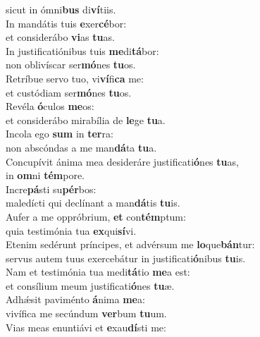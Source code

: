\evenverse sicut in ómni\textbf{bus} di\textbf{ví}tiis.\\
\oddverse In mandátis tuis \textbf{e}xer\textbf{cé}bor:~\*\\
\oddverse et considerábo \textbf{vi}as \textbf{tu}as.\\
\evenverse In justificatiónibus tuis \textbf{me}di\textbf{tá}bor:~\*\\
\evenverse non oblivíscar ser\textbf{mó}nes \textbf{tu}os.\\
\oddverse Retríbue servo tuo, vi\textbf{ví}fi\textbf{ca} me:~\*\\
\oddverse et custódiam ser\textbf{mó}nes \textbf{tu}os.\\
\evenverse Revéla \textbf{ó}culos \textbf{me}os:~\*\\
\evenverse et considerábo mirabília de \textbf{le}ge \textbf{tu}a.\\
\oddverse Incola ego \textbf{sum} in \textbf{ter}ra:~\*\\
\oddverse non abscóndas a me man\textbf{dá}ta \textbf{tu}a.\\
\evenverse Concupívit ánima mea desideráre justificati\textbf{ó}nes \textbf{tu}as,~\*\\
\evenverse in \textbf{om}ni \textbf{tém}pore.\\
\oddverse Incre\textbf{pá}sti su\textbf{pér}bos:~\*\\
\oddverse maledícti qui declínant a man\textbf{dá}tis \textbf{tu}is.\\
\evenverse Aufer a me oppróbrium, \textbf{et} con\textbf{tém}ptum:~\*\\
\evenverse quia testimónia tua \textbf{ex}qui\textbf{sí}vi.\\
\oddverse Etenim sedérunt príncipes, et advérsum me \textbf{lo}que\textbf{bán}tur:~\*\\
\oddverse servus autem tuus exercebátur in justificati\textbf{ó}nibus \textbf{tu}is.\\
\evenverse Nam et testimónia tua medi\textbf{tá}tio \textbf{me}a est:~\*\\
\evenverse et consílium meum justificati\textbf{ó}nes \textbf{tu}æ.\\
\oddverse Adhǽsit paviménto \textbf{á}nima \textbf{me}a:~\*\\
\oddverse vivífica me secúndum \textbf{ver}bum \textbf{tu}um.\\
\evenverse Vias meas enuntiávi et \textbf{e}xau\textbf{dí}sti me:~\*\\

